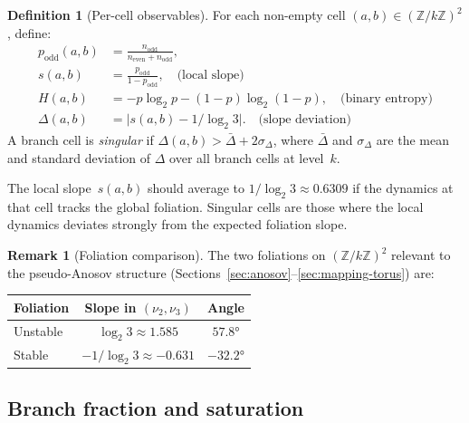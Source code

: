 \documentclass[11pt,a4paper]{article}
\newcommand{\Z}{\mathbb{Z}}
\theoremstyle{plain}
\theoremstyle{definition}
\newtheorem{definition}[theorem]{Definition}
\newtheorem{remark}[theorem]{Remark}
\begin{document}
\begin{definition}[Per-cell observables]\label{def:cell-observables}
    For each non-empty cell $(a, b) \in (\Z/k\Z)^2$, define:
    \begin{align}
        p_{\mathrm{odd}}(a,b) &= \frac{n_{\mathrm{odd}}}{n_{\mathrm{even}} + n_{\mathrm{odd}}}, \label{eq:podd} \\
        s(a,b) &= \frac{p_{\mathrm{odd}}}{1 - p_{\mathrm{odd}}}, \quad\text{(local slope)} \label{eq:local-slope} \\
        H(a,b) &= -p \log_2 p - (1{-}p) \log_2(1{-}p), \quad\text{(binary entropy)} \label{eq:branch-entropy} \\
        \Delta(a,b) &= \bigl|s(a,b) - 1/\log_2 3\bigr|. \quad\text{(slope deviation)} \label{eq:slope-dev}
    \end{align}
    A branch cell is \emph{singular} if $\Delta(a,b) > \bar{\Delta} + 2\sigma_\Delta$,
    where $\bar{\Delta}$ and $\sigma_\Delta$ are the mean and standard deviation
    of $\Delta$ over all branch cells at level~$k$.
\end{definition}

The local slope~$s(a,b)$ should average to $1/\log_2 3 \approx 0.6309$
if the dynamics at that cell tracks the global foliation.  Singular cells
are those where the local dynamics deviates strongly from the expected
foliation slope.

\begin{remark}[Foliation comparison]
    The two foliations on $(\Z/k\Z)^2$ relevant to the pseudo-Anosov
    structure (Sections~\ref{sec:anosov}--\ref{sec:mapping-torus}) are:
    \begin{center}
    \renewcommand{\arraystretch}{1.15}
    \begin{tabular}{lcc}
        \toprule
        Foliation & Slope in $(\nu_2, \nu_3)$ & Angle \\
        \midrule
        Unstable & $\log_2 3 \approx 1.585$ & $57.8°$ \\
        Stable & $-1/\log_2 3 \approx -0.631$ & $-32.2°$ \\
        \bottomrule
    \end{tabular}
    \end{center}
\end{remark}


\subsection{Branch fraction and saturation}
\end{document}
